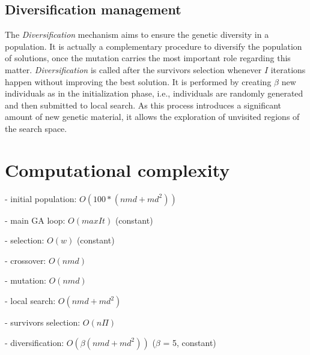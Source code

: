 \subsection{Diversification management}
The \textit{Diversification} mechanism aims to ensure the genetic diversity in a population. It is actually a complementary procedure to diversify the population of solutions, once the mutation carries the most important role regarding this matter. \textit{Diversification} is called after the survivors selection whenever $I$ iterations happen without improving the best solution. It is performed by creating $\beta$ new individuals as in the initialization phase, i.e., individuals are randomly generated and then submitted to local search. As this process introduces a significant amount of new genetic material, it allows the exploration of unvisited regions of the search space.

\section{Computational complexity}

- initial population: $O(100 * (nmd + md^2))$

- main GA loop: $O(maxIt)$ (constant)

- selection: $O(w)$ (constant)

- crossover: $O(nmd)$

- mutation: $O(nmd)$

- local search: $O(nmd + md^2)$

- survivors selection: $O(n\Pi)$

- diversification: $O(\beta (nmd + md^2))$ ($\beta$ = 5, constant)